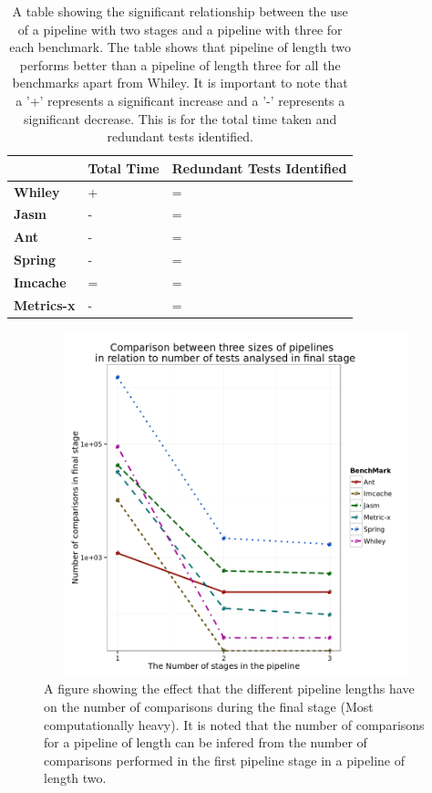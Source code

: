 \begin{table}[h]
\centering
\begin{tabular}{|l|l|l|}
\hline
{\bf }          & {\bf Total Time} & {\bf Redundant Tests Identified} \\ \hline
{\bf Whiley}    & +                & =                           \\ \hline
{\bf Jasm}      & -                & =                           \\ \hline
{\bf Ant}       & -                & =                           \\ \hline
{\bf Spring}    & -                & =                           \\ \hline
{\bf Imcache}   & =                & =                           \\ \hline
{\bf Metrics-x} & -                & =                           \\ \hline
\end{tabular}
\caption{A table showing the significant relationship between the use of a pipeline with two stages and a pipeline with three for each benchmark. The table shows that pipeline of length two performs better than a pipeline of length three for all the benchmarks apart from Whiley. It is important to note that a '+' represents a significant increase and a '-' represents a significant decrease. This is for the total time taken and redundant tests identified.}
\label{pipelinesig}
\end{table}

\begin{figure}[h]
\begin{center}
\includegraphics[height=10cm, width = 14.5cm]{Pipeline.png}
\end{center}
\caption{A figure showing the effect that the different pipeline lengths have on the number of comparisons during the final stage (Most computationally heavy). It is noted that the number of comparisons for a pipeline of length can be infered from the number of comparisons performed in the first pipeline stage in a pipeline of length two.}
\label{fig:pipelinegraph}
\end{figure}

